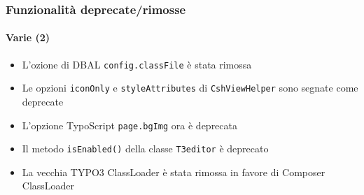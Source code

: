 \begin{frame}[fragile]
	\frametitle{Funzionalità deprecate/rimosse}
	\framesubtitle{Varie (2)}

	\begin{itemize}

		\item L'ozione di DBAL \texttt{config.classFile} è stata rimossa

		\item Le opzioni \texttt{iconOnly} e \texttt{styleAttributes} di
			\texttt{CshViewHelper} sono segnate come deprecate

		\item L'opzione TypoScript \texttt{page.bgImg} ora è deprecata

		\item Il metodo \texttt{isEnabled()} della classe \texttt{T3editor} è deprecato

		\item La vecchia TYPO3 ClassLoader è stata rimossa in favore di Composer ClassLoader

	\end{itemize}

\end{frame}

